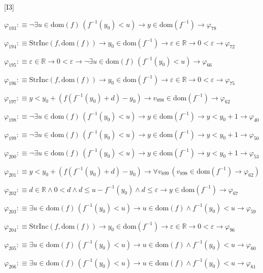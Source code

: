 \begin{fullproof}{[I3]}
\begin{abbrevlist}
\item $\varphi_{193} :\equiv \neg \exists u \in \mathrm{dom}(f)\,(f^{-1}(y_{0}) < u) \to y \in \mathrm{dom}(f^{-1}) \to \varphi_{78}$
\item $\varphi_{194} :\equiv \mathrm{StrInc}(f,\mathrm{dom}(f)) \to y_{0} \in \mathrm{dom}(f^{-1}) \to \varepsilon \in \mathbb{R} \to 0 < \varepsilon \to \varphi_{72}$
\item $\varphi_{195} :\equiv \varepsilon \in \mathbb{R} \to 0 < \varepsilon \to \neg \exists u \in \mathrm{dom}(f)\,(f^{-1}(y_{0}) < u) \to \varphi_{66}$
\item $\varphi_{196} :\equiv \mathrm{StrInc}(f,\mathrm{dom}(f)) \to y_{0} \in \mathrm{dom}(f^{-1}) \to \varepsilon \in \mathbb{R} \to 0 < \varepsilon \to \varphi_{75}$
\item $\varphi_{197} :\equiv y < y_{0} + (f(f^{-1}(y_{0}) + d) - y_{0}) \to v_{898} \in \mathrm{dom}(f^{-1}) \to \varphi_{62}$
\item $\varphi_{198} :\equiv \neg \exists u \in \mathrm{dom}(f)\,(f^{-1}(y_{0}) < u) \to y \in \mathrm{dom}(f^{-1}) \to y < y_{0} + 1 \to \varphi_{40}$
\item $\varphi_{199} :\equiv \neg \exists u \in \mathrm{dom}(f)\,(f^{-1}(y_{0}) < u) \to y \in \mathrm{dom}(f^{-1}) \to y < y_{0} + 1 \to \varphi_{50}$
\item $\varphi_{200} :\equiv \neg \exists u \in \mathrm{dom}(f)\,(f^{-1}(y_{0}) < u) \to y \in \mathrm{dom}(f^{-1}) \to y < y_{0} + 1 \to \varphi_{53}$
\item $\varphi_{201} :\equiv y < y_{0} + (f(f^{-1}(y_{0}) + d) - y_{0}) \to \forall v_{899}\,(v_{898} \in \mathrm{dom}(f^{-1}) \to \varphi_{62})$
\item $\varphi_{202} :\equiv d \in \mathbb{R} \land 0 < d \land d \leq u - f^{-1}(y_{0}) \land d \leq \varepsilon \to y \in \mathrm{dom}(f^{-1}) \to \varphi_{67}$
\item $\varphi_{203} :\equiv \exists u \in \mathrm{dom}(f)\,(f^{-1}(y_{0}) < u) \to u \in \mathrm{dom}(f) \land f^{-1}(y_{0}) < u \to \varphi_{59}$
\item $\varphi_{204} :\equiv \mathrm{StrInc}(f,\mathrm{dom}(f)) \to y_{0} \in \mathrm{dom}(f^{-1}) \to \varepsilon \in \mathbb{R} \to 0 < \varepsilon \to \varphi_{96}$
\item $\varphi_{205} :\equiv \exists u \in \mathrm{dom}(f)\,(f^{-1}(y_{0}) < u) \to u \in \mathrm{dom}(f) \land f^{-1}(y_{0}) < u \to \varphi_{60}$
\item $\varphi_{206} :\equiv \exists u \in \mathrm{dom}(f)\,(f^{-1}(y_{0}) < u) \to u \in \mathrm{dom}(f) \land f^{-1}(y_{0}) < u \to \varphi_{61}$

\end{abbrevlist}
\end{fullproof}
